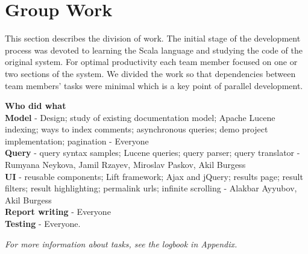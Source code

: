 \section{Group Work}\label{sec:groupwork}
This section describes the division of work. The initial stage of the development process was  devoted to learning the Scala language and studying the code of the original system. For optimal productivity each team member focused on one or two sections of the system. We divided the work so that dependencies between team members’ tasks were minimal which is a key point of parallel development. 

\textbf{Who did what} \\
\textbf{Model} - Design; study of existing documentation model; Apache Lucene indexing; ways to index comments; asynchronous queries; demo project implementation; pagination - Everyone \\
\textbf{Query} - query syntax samples; Lucene queries; query parser; query translator - Rumyana Neykova, Jamil Rzayev, Miroslav Paskov, Akil Burgess \\
\textbf{UI} - reusable components; Lift framework; Ajax and jQuery; results page; result filters; result highlighting; permalink urls; infinite scrolling - Alakbar Ayyubov, Akil Burgess \\
\textbf{Report writing} - Everyone \\
\textbf{Testing} - Everyone.

\emph{\color{red} For more information about tasks, see the logbook in Appendix.}